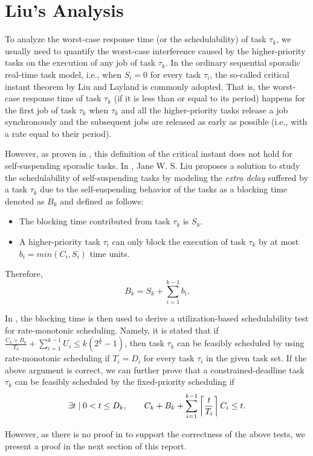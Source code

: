 \section{Liu's Analysis}

To analyze the worst-case response time (or the schedulability) of task $\tau_k$, we usually need to quantify the worst-case interference caused by the higher-priority tasks on the execution of any job of task $\tau_k$. In the ordinary sequential sporadic real-time task model, i.e., when $S_i=0$ for every task $\tau_i$, the so-called critical instant theorem by Liu and Layland \cite{Liu_1973} is commonly adopted. That is, the worst-case response time of task $\tau_k$ (if it is less than or equal to its period) happens for the first job of task $\tau_k$ when $\tau_k$ and all the higher-priority tasks release a job synchronously and the subsequent jobs are released as early as possible (i.e., with a rate equal to their period). 

However, as proven in \cite{ecrts15nelissen}, this definition of the critical instant does not hold for self-suspending sporadic tasks.  
In \cite{Liu:2000:RS:518501}, Jane W. S. Liu proposes a solution to study the schedulability of self-suspending tasks by modeling the \emph{extra delay} suffered by a task $\tau_k$ due to the self-suspending behavior of the tasks as a blocking time denoted as $B_k$ and defined as follows:
\begin{itemize}
\item The blocking time contributed from task $\tau_k$ is $S_k$.
\item A higher-priority task $\tau_i$ can only block the execution of task $\tau_k$ by at most $b_i=min(C_i, S_i)$ time units.
\end{itemize}
Therefore, 
\begin{equation}
\label{eq:Bk}
B_k = S_k + \sum_{i=1}^{k-1} b_i.
\end{equation}

In \cite{Liu:2000:RS:518501}, the blocking time is then used to derive a utilization-based schedulability test for rate-monotonic scheduling. Namely, it is stated that if $\frac{C_k+B_k}{T_k} + \sum_{i=1}^{k-1} U_i \leq k (2^{\frac{1}{k}}-1)$, then task $\tau_k$ can be feasibly scheduled by using rate-monotonic scheduling if $T_i=D_i$ for every task $\tau_i$ in the given task set. If the above argument is correct, we can further prove that a constrained-deadline task $\tau_k$ can be feasibly scheduled by the fixed-priority scheduling if
\begin{equation}
\label{eq:TDA-suspension}
\exists t \mid 0 < t \leq D_k, \qquad C_k + B_k + \sum_{i=1}^{k-1}\left\lceil{\frac{t}{T_i}}\right\rceil C_i \leq t.
\end{equation}
  
However, as there is no proof in \cite{Liu:2000:RS:518501} to support the correctness of the above tests, we present a proof in the next section of this report.
  
  
  
  
  
  
  
  
  
  
  
  
  